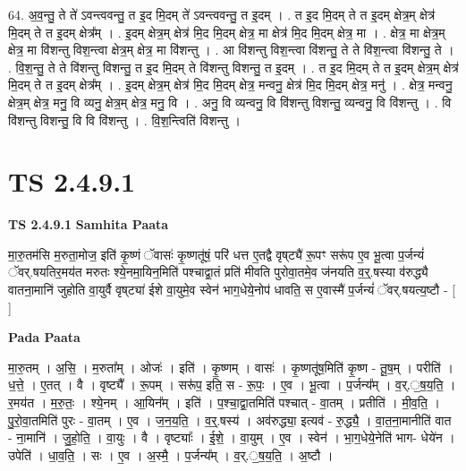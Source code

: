 \documentclass[17pt]{extarticle}
\begin{document}
64. अ॒व॒न्तु॒ ते ते॑ ऽवन्त्ववन्तु॒ त इ॒द मि॒दम् ते॑ ऽवन्त्ववन्तु॒ त इ॒दम् । . त इ॒द मि॒दम् ते त इ॒दम् क्षेत्र॒म् क्षेत्र॑ मि॒दम् ते त इ॒दम् क्षेत्र᳚म् । . इ॒दम् क्षेत्र॒म् क्षेत्र॑ मि॒द मि॒दम् क्षेत्र॒ मा क्षेत्र॑ मि॒द मि॒दम् क्षेत्र॒ मा । . क्षेत्र॒ मा क्षेत्र॒म् क्षेत्र॒ मा वि॑शन्तु विश॒न्त्वा क्षेत्र॒म् क्षेत्र॒ मा वि॑शन्तु । . आ वि॑शन्तु विश॒न्त्वा वि॑शन्तु॒ ते ते वि॑श॒न्त्वा वि॑शन्तु॒ ते । . वि॒श॒न्तु॒ ते ते वि॑शन्तु विशन्तु॒ त इ॒द मि॒दम् ते वि॑शन्तु विशन्तु॒ त इ॒दम् । . त इ॒द मि॒दम् ते त इ॒दम् क्षेत्र॒म् क्षेत्र॑ मि॒दम् ते त इ॒दम् क्षेत्र᳚म् । . इ॒दम् क्षेत्र॒म् क्षेत्र॑ मि॒द मि॒दम् क्षेत्र॒ मन्वनु॒ क्षेत्र॑ मि॒द मि॒दम् क्षेत्र॒ मनु॑ । . क्षेत्र॒ मन्वनु॒ क्षेत्र॒म् क्षेत्र॒ मनु॒ वि व्यनु॒ क्षेत्र॒म् क्षेत्र॒ मनु॒ वि । . अनु॒ वि व्यन्वनु॒ वि वि॑शन्तु विशन्तु॒ व्यन्वनु॒ वि वि॑शन्तु । . वि वि॑शन्तु विशन्तु॒ वि वि वि॑शन्तु । . वि॒श॒न्त्विति॑ विशन्तु । \newline
\pagebreak
{}
\section*{ TS 2.4.9.1 }

\textbf{TS 2.4.9.1 } \newline
\textbf{Samhita Paata} \newline

मा॒रु॒तम॑सि म॒रुता॒मोज॒ इति॑ कृ॒ष्णं ॅवासः॑ कृ॒ष्णतू॑षं॒ परि॑ धत्त ए॒तद्वै वृष्‌ट्यै॑ रू॒पꣳ सरू॑प ए॒व भू॒त्वा प॒र्जन्यं॑ ॅवर्.षयतिर॒मय॑त मरुतः श्ये॒नमा॒यिन॒मिति॑ पश्चाद्वा॒तं प्रति॑ मीवति पुरोवा॒तमे॒व ज॑नयति व॒र्॒.षस्या व॑रुद्ध्यै वातना॒मानि॑ जुहोति वा॒युर्वै वृष्‌ट्या॑ ईशे वा॒युमे॒व स्वेन॑ भाग॒धेये॒नोप॑ धावति॒ स ए॒वास्मै॑ प॒र्जन्यं॑ ॅवर्.षयत्य॒ष्टौ - [  ] \newline

\textbf{Pada Paata} \newline

मा॒रु॒तम् । अ॒सि॒ । म॒रुता᳚म् । ओजः॑ । इति॑ । कृ॒ष्णम् । वासः॑ । कृ॒ष्णतू॑ष॒मिति॑ कृ॒ष्ण - तू॒ष॒म् । परीति॑ । ध॒त्ते॒ । ए॒तत् । वै । वृष्ट्यै᳚ । रू॒पम् । सरू॑प॒ इति॒ स - रू॒पः॒ ।  ए॒व । भू॒त्वा । प॒र्जन्य᳚म् । व॒र्.॒ष॒य॒ति॒ । र॒मय॑त । म॒रु॒तः॒ । श्ये॒नम् । आ॒यिन᳚म् । इति॑ । प॒श्चा॒द्वा॒तमिति॑ पश्चात् - वा॒तम् । प्रतीति॑ । मी॒व॒ति॒ । पु॒रो॒वा॒तमिति॑ पुरः - वा॒तम् । ए॒व । ज॒न॒य॒ति॒ । व॒र्॒.षस्य॑ । अव॑रुद्ध्या॒ इत्यव॑ - रु॒द्ध्यै॒ । वा॒त॒ना॒मानीति॑ वात - ना॒मानि॑ । जु॒हो॒ति॒ । वा॒युः । वै । वृष्ट्याः᳚ । ई॒शे॒ ।   वा॒युम् । ए॒व । स्वेन॑ । भा॒ग॒धेये॒नेति॑ भाग- धेये॑न । उपेति॑ । धा॒व॒ति॒ । सः । ए॒व । अ॒स्मै॒ । प॒र्जन्य᳚म् । व॒र्.॒ष॒य॒ति॒ । अ॒ष्टौ ।  \newline
\end{document}
